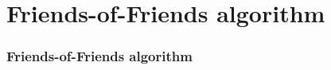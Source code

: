 \section{Friends-of-Friends algorithm}
\begin{frame}

    \frametitle{Friends-of-Friends algorithm}

    \begin{columns}
        \begin{column}{0.65\textwidth}
        \end{column}
        \begin{column}{0.35\textwidth}
            \only<1>{%
            }
            \only<2>{%
            }
        \end{column}
    \end{columns}
\end{frame}

